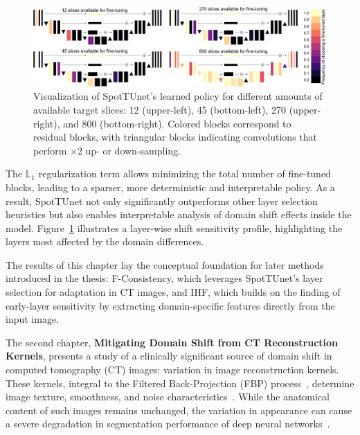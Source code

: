 \begin{landscape}
	\begin{figure}[p]
		\centering
		\includegraphics[width=\linewidth]{Dissertation/Figures/2_mri/layerwise_template.pdf}
		\caption{Visualization of SpotTUnet's learned policy for different amounts of available target slices: 12 (upper-left), 45 (bottom-left), 270 (upper-right), and 800 (bottom-right). Colored blocks correspond to residual blocks, with triangular blocks indicating convolutions that perform $\times 2$ up- or down-sampling.}
		\label{fig:layerswise_template}
	\end{figure}
\end{landscape}

The $\mathbb{L}_1$ regularization term allows minimizing the total number of fine-tuned blocks, leading to a sparser, more deterministic and interpretable policy. As a result, SpotTUnet not only significantly outperforms other layer selection heuristics but also enables interpretable analysis of domain shift effects inside the model. Figure~\ref{fig:layerswise_template} illustrates a layer-wise shift sensitivity profile, highlighting the layers most affected by the domain differences.

The results of this chapter lay the conceptual foundation for later methods introduced in the thesis: F-Consistency, which leverages SpotTUnet’s layer selection for adaptation in CT images, and IHF, which builds on the finding of early-layer sensitivity by extracting domain-specific features directly from the input image.




The second chapter, \textbf{Mitigating Domain Shift from CT Reconstruction Kernels}, presents a study of a clinically significant source of domain shift in computed tomography (CT) images: variation in image reconstruction kernels. These kernels, integral to the Filtered Back-Projection (FBP) process~\cite{schofield2020image}, determine image texture, smoothness, and noise characteristics~\cite{schaller2003spatial}. While the anatomical content of such images remains unchanged, the variation in appearance can cause a severe degradation in segmentation performance of deep neural networks~\cite{choe2019deep,lee2019ct}.

